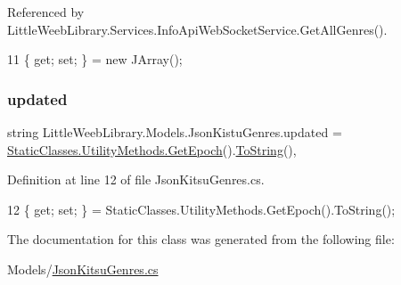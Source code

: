 Referenced by Little\+Weeb\+Library.\+Services.\+Info\+Api\+Web\+Socket\+Service.\+Get\+All\+Genres().


\begin{DoxyCode}
11 \{ \textcolor{keyword}{get}; \textcolor{keyword}{set}; \} = \textcolor{keyword}{new} JArray();
\end{DoxyCode}
\mbox{\label{class_little_weeb_library_1_1_models_1_1_json_kistu_genres_a64039ea4f8a80b3048979813fcce9099}} 
\subsubsection{\texorpdfstring{updated}{updated}}
{\footnotesize\ttfamily string Little\+Weeb\+Library.\+Models.\+Json\+Kistu\+Genres.\+updated = \mbox{\hyperlink{class_little_weeb_library_1_1_static_classes_1_1_utility_methods_a12336d9e64983ddabaad8950486fafb2}{Static\+Classes.\+Utility\+Methods.\+Get\+Epoch}}().\mbox{\hyperlink{class_little_weeb_library_1_1_models_1_1_json_kistu_genres_aff942cf4016346e9df66de3b8c2b7cf6}{To\+String}}()\hspace{0.3cm}{\ttfamily [get]}, {\ttfamily [set]}}



Definition at line 12 of file Json\+Kitsu\+Genres.\+cs.


\begin{DoxyCode}
12 \{ \textcolor{keyword}{get}; \textcolor{keyword}{set}; \} = StaticClasses.UtilityMethods.GetEpoch().ToString();
\end{DoxyCode}


The documentation for this class was generated from the following file\+:\begin{DoxyCompactItemize}
\item 
Models/\mbox{\hyperlink{_json_kitsu_genres_8cs}{Json\+Kitsu\+Genres.\+cs}}\end{DoxyCompactItemize}
